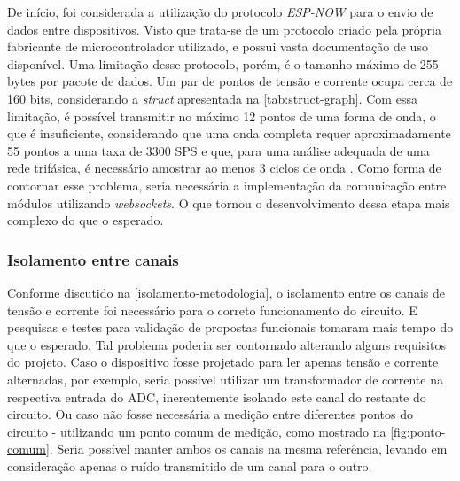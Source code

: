 De início, foi considerada a utilização do protocolo \textit{ESP-NOW} para o envio de dados entre dispositivos. Visto que trata-se de um protocolo criado pela própria fabricante de microcontrolador utilizado, e possui vasta documentação de uso disponível.
Uma limitação desse protocolo, porém, é o tamanho máximo de 255 bytes por pacote de dados. Um par de pontos de tensão e corrente ocupa cerca de 160 bits, considerando a \textit{struct} apresentada na \autoref{tab:struct-graph}. Com essa limitação, é possível transmitir no máximo 12 pontos de uma forma de onda, o que é insuficiente, considerando que uma onda completa requer aproximadamente 55 pontos a uma taxa de 3300 \gls{SPS} e que, para uma análise adequada de uma rede trifásica, é necessário amostrar ao menos 3 ciclos de onda \cite{3ph-ozm}.
Como forma de contornar esse problema, seria necessária a implementação da comunicação entre módulos utilizando \textit{websockets}. O que tornou o desenvolvimento dessa etapa mais complexo do que o esperado.

\subsubsection{Isolamento entre canais}\label{isola-canais-dific}

Conforme discutido na \autoref{isolamento-metodologia}, o isolamento entre os canais de tensão e corrente foi necessário para o correto funcionamento do circuito. E pesquisas e testes para validação de propostas funcionais tomaram mais tempo do que o esperado.
Tal problema poderia ser contornado alterando alguns requisitos do projeto. 
Caso o dispositivo fosse projetado para ler apenas tensão e corrente alternadas, por exemplo, seria possível utilizar um transformador de corrente na respectiva entrada do \gls{ADC}, inerentemente isolando este canal do restante do circuito. 
Ou caso não fosse necessária a medição entre diferentes pontos do circuito - utilizando um ponto comum de medição, como mostrado na \autoref{fig:ponto-comum}. Seria possível manter ambos os canais na mesma referência, levando em consideração apenas o ruído transmitido de um canal para o outro.

